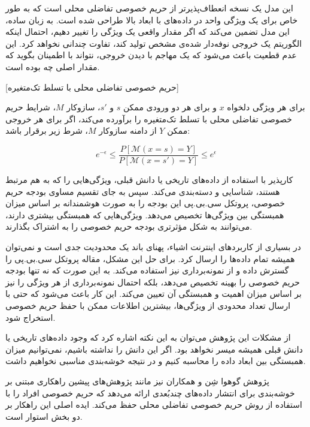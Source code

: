این مدل یک نسخه انعطاف‌پذیرتر از حریم خصوصی تفاضلی محلی است که به طور خاص برای یک ویژگی واحد در داده‌های با ابعاد بالا طراحی شده است. به زبان ساده، این مدل تضمین می‌کند که اگر مقدار واقعی یک ویژگی را تغییر دهیم، احتمال اینکه الگوریتم یک خروجی نوفه‌دار شده‌ی مشخص تولید کند، تفاوت چندانی نخواهد کرد. این عدم قطعیت باعث می‌شود که یک مهاجم با دیدن خروجی، نتواند با اطمینان بگوید که مقدار اصلی چه بوده است.

[حریم خصوصی تفاضلی محلی با تسلط تک‌متغیره]

برای هر ویژگی دلخواه $x$ و برای هر دو ورودی ممکن $s$ و $s'$، سازوکار $M$، شرایط حریم خصوصی تفاضلی محلی با تسلط تک‌متغیره را برآورده می‌کند، اگر برای هر خروجی ممکن $Y$ از دامنه سازوکار $M$، شرط زیر برقرار باشد:

\begin{equation}
e^{-\epsilon} \le \frac{P[\mathcal{M}(x = s) = Y]}{P[\mathcal{M}(x = s') = Y]} \le e^{\epsilon}
\end{equation}


کارپذیر با استفاده از داده‌های تاریخی یا دانش قبلی، ویژگی‌هایی را که به هم مرتبط هستند، شناسایی و دسته‌بندی می‌کند. سپس به جای تقسیم مساوی بودجه حریم خصوصی، پروتکل سی.بی.پی این بودجه را به صورت هوشمندانه بر اساس میزان همبستگی بین ویژگی‌ها تخصیص می‌دهد. ویژگی‌هایی که همبستگی بیشتری دارند، می‌توانند به شکل مؤثرتری بودجه حریم خصوصی را به اشتراک بگذارند.

در بسیاری از کاربردهای اینترنت اشیاء، پهنای باند یک محدودیت جدی است و نمی‌توان همیشه تمام داده‌ها را ارسال کرد. برای حل این مشکل، مقاله پروتکل سی.بی.پی را گسترش داده و از نمونه‌برداری نیز استفاده می‌کند. به این صورت که نه تنها بودجه حریم خصوصی را بهینه تخصیص می‌دهد، بلکه احتمال نمونه‌برداری از هر ویژگی را نیز بر اساس میزان اهمیت و همبستگی آن تعیین می‌کند. این کار باعث می‌شود که حتی با ارسال تعداد محدودی از ویژگی‌ها، بیشترین اطلاعات ممکن با حفظ حریم خصوصی استخراج شود.

از مشکلات این پژوهش می‌توان به این نکته اشاره کرد که وجود داده‌های تاریخی یا دانش قبلی همیشه میسر نخواهد بود. اگر این دانش را نداشته باشیم، نمی‌توانیم میزان همبستگی بین ابعاد داده را محاسبه کنیم و در نتیجه خوشه‌بندی مناسبی نخواهیم داشت.


پژوهش گوهوا شِن و همکاران  نیز مانند پژوهش‌های پیشین راهکاری مبتنی بر خوشه‌بندی برای انتشار داده‌های چندبُعدی ارائه می‌دهد که حریم خصوصی افراد را با استفاده از روش حریم خصوصی تفاضلی محلی حفظ می‌کند. ایده اصلی این راهکار بر دو بخش استوار است.

